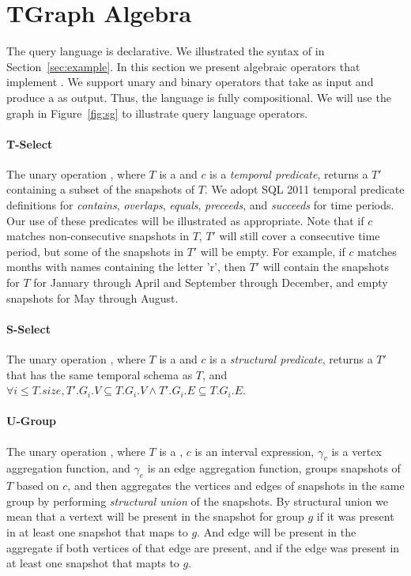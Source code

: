 \section{TGraph Algebra}
\label{sec:lang}

The \ql query language is declarative.  We illustrated the syntax of
\ql in Section~\ref{sec:example}.  In this section we present
algebraic operators that implement \ql.  We support unary and binary
operators that take \tgs as input and produce a \tg as output.  Thus,
the language is fully compositional.  We will use the graph in
Figure~\ref{fig:sg} to illustrate query language operators.

\paragraph*{T-Select} The unary operation , where $T$ is
 a \tg and $c$ is a {\em temporal predicate}, returns a \tg $T'$
 containing a subset of the snapshots of $T$.  We adopt SQL 2011
 temporal predicate definitions for {\em contains}, {\em overlaps},
 {\em equals}, {\em preceeds}, and {\em succeeds} for time periods.
 Our use of these predicates will be illustrated as appropriate.  Note
 that if $c$ matches non-consecutive snapshots in $T$, $T'$ will still
 cover a consecutive time period, but some of the snapshots in $T'$
 will be empty.  For example, if $c$ matches months with names
 containing the letter 'r', then $T'$ will contain the snapshots for
 $T$ for January through April and September through December, and
 empty snapshots for May through August.

\paragraph*{S-Select} The unary operation , where $T$ is a \tg 
and $c$ is a {\em structural predicate}, returns a \tg $T'$ that has
the same temporal schema as $T$, and $\forall i \leq T.size, T'.G_i.V
\subseteq T.G_i.V \wedge T'.G_i.E \subseteq T.G_i.E$.  

\paragraph*{U-Group} The unary operation , 
where $T$ is a \tg, $c$ is an interval expression, $\gamma_v$ is a
vertex aggregation function, and $\gamma_e$ is an edge aggregation
function, groups snapshots of $T$ based on $c$, and then aggregates
the vertices and edges of snapshots in the same group by performing
{\em structural union} of the snapshots.  By structural union we mean
that a vertext will be present in the snapshot for group $g$ if it was
present in at least one snapshot that maps to $g$.  And edge will be
present in the aggregate if both vertices of that edge are present,
and if the edge was present in at least one snapshot that mapts to
$g$.

